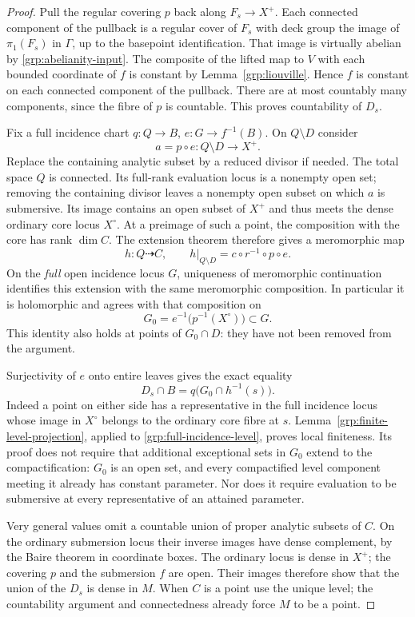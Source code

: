\begin{proof}
Pull the regular covering $p$ back along $F_s\to X^+$.
Each connected component of the pullback is a regular cover of $F_s$
with deck group the image of $\pi_1(F_s)$ in $\Gamma$, up to the
basepoint identification.  That image is virtually abelian by
\eqref{grp:abelianity-input}.  The composite of the lifted map to $V$
with each bounded coordinate of $f$ is constant by
Lemma~\ref{grp:liouville}.  Hence $f$ is constant on each connected
component of the pullback.  There are at most countably many components,
since the fibre of $p$ is countable.  This proves countability of $D_s$.

Fix a full incidence chart $q:Q\to B$, $e:G\to f^{-1}(B)$.
On $Q\setminus D$ consider
\[
 a=p\circ e:Q\setminus D\longrightarrow X^+.
\]
Replace the containing analytic subset by a reduced divisor if needed.
The total space $Q$ is connected.  Its full-rank evaluation locus is a
nonempty open set; removing the containing divisor leaves a nonempty
open subset on which $a$ is submersive.  Its image contains an open
subset of $X^+$ and thus meets the dense ordinary core locus $X^\circ$.
At a preimage of such a point, the composition with the core has rank
$\dim C$.  The extension theorem therefore gives a
meromorphic map
\[
 h:Q\dashrightarrow C,
 \qquad h|_{Q\setminus D}=c\circ r^{-1}\circ p\circ e.
\]
On the \emph{full} open incidence locus $G$, uniqueness of meromorphic
continuation identifies this extension with the same meromorphic
composition.  In particular it is holomorphic and agrees with that
composition on
\[
 G_0=e^{-1}\bigl(p^{-1}(X^\circ)\bigr)\subset G.
\]
This identity also holds at points of $G_0\cap D$: they have not been
removed from the argument.

Surjectivity of $e$ onto entire leaves gives the exact equality
\begin{equation}\label{grp:full-incidence-level}
 D_s\cap B=q\bigl(G_0\cap h^{-1}(s)\bigr).
\end{equation}
Indeed a point on either side has a representative in the full incidence
locus whose image in $X^\circ$ belongs to the ordinary core fibre at
$s$.  Lemma~\ref{grp:finite-level-projection}, applied to
\eqref{grp:full-incidence-level}, proves local finiteness.  Its proof
does not require that additional exceptional sets in $G_0$ extend to
the compactification: $G_0$ is an open set, and every compactified level
component meeting it already has constant parameter.  Nor does it
require evaluation to be submersive at every representative of an
attained parameter.

Very general values omit a countable union of proper analytic subsets
of $C$.  On the ordinary submersion locus their inverse images have
dense complement, by the Baire theorem in coordinate boxes.  The
ordinary locus is dense in $X^+$; the covering $p$ and the submersion
$f$ are open.  Their images therefore show that the union of the $D_s$
is dense in $M$.  When $C$ is a point use the unique level; the
countability argument and connectedness already force $M$ to be a point.
\end{proof}

